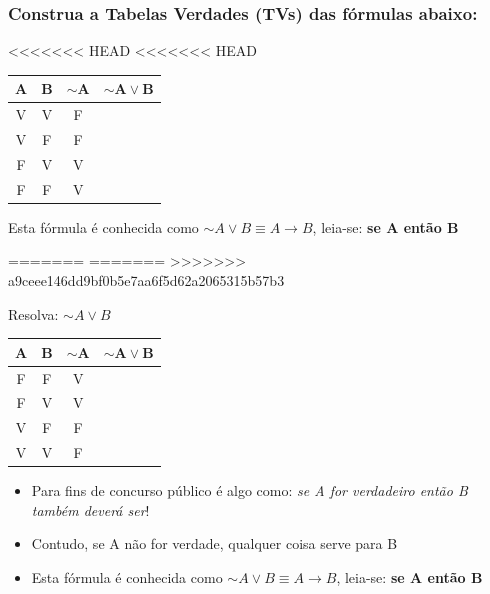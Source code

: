 \documentclass{beamer}
\begin{document}
\begin{frame}
\frametitle{Construa a Tabelas Verdades (TVs) das fórmulas abaixo:}
<<<<<<< HEAD
<<<<<<< HEAD
\begin{block}{}

	\begin{tabular}{|c|c|c|c|}
	\hline
	$\mathbf{A}$ & $\mathbf{B}$ & $\mathbf{\sim A}$ & $\mathbf{\sim A \vee B}$ \\
	\hline
	V & V & F & \\
	\hline
	V & F & F & \\
	\hline
	F & V & V & \\
	\hline
	F & F & V & \\
	\hline
	\end{tabular}
  
  Esta fórmula é conhecida como $\sim A \vee B \equiv A \rightarrow B$, leia-se: \textbf{se A  então B}
\end{block}
=======
=======
>>>>>>> a9ceee146dd9bf0b5e7aa6f5d62a2065315b57b3


\begin{block}{Resolva: $\sim A \vee B$}
\begin{center}

	\begin{tabular}{|c|c|c|c|}
	\hline 	\hline
	$\mathbf{A}$ & $\mathbf{B}$ & $\mathbf{\sim A}$ & $\mathbf{\sim A \vee B}$ \\
	\hline
	F & F & V & \\
  \hline
	F & V & V & \\
	\hline
	V & F & F & \\
	\hline
	V & V & F & \\
	\hline 	\hline
	\end{tabular}
\end{center}
  
\begin{itemize}
   \item Para fins de concurso público é algo como: \textit{se A for verdadeiro então B também deverá ser}!
   \item Contudo, se A não for verdade, qualquer coisa serve para B
    \item  Esta fórmula é conhecida como $\sim A \vee B \equiv A \rightarrow B$, leia-se: \textbf{se A  então B}

  \end{itemize}
  \end{block}


\end{frame}
\end{document}
